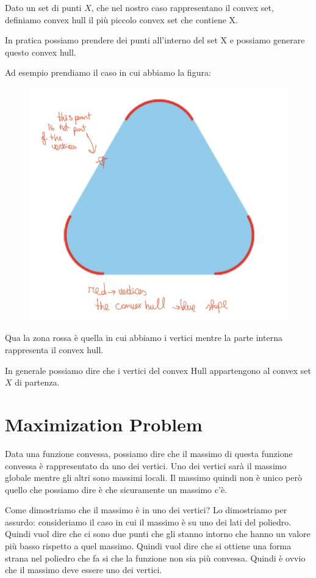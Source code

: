 \documentclass[14pt]{extreport}
\begin{document}
Dato un set di punti $X$, che nel nostro caso rappresentano il convex set, definiamo convex hull il più piccolo convex set che contiene X.

In pratica possiamo prendere dei punti all'interno del set X e possiamo generare questo convex hull.

Ad esempio prendiamo il caso in cui abbiamo la figura:

\begin{figure}[H]
\centering
\includegraphics[width=0.7\linewidth]{230.jpeg}
\end{figure}

Qua la zona rossa è quella in cui abbiamo i vertici mentre la parte interna rappresenta il convex hull.

In generale possiamo dire che i vertici del convex Hull appartengono al convex set $X$ di partenza.

\section{Maximization Problem}

Data una funzione convessa, possiamo dire che il massimo di questa funzione convessa è rappresentato da uno dei vertici. Uno dei vertici sarà il
massimo globale mentre gli altri sono massimi locali. Il massimo quindi non è unico però quello che possiamo dire è che sicuramente un massimo c'è.

Come dimostriamo che il massimo è in uno dei vertici? Lo dimostriamo per assurdo: consideriamo il caso in cui il massimo è su uno dei lati del
poliedro. Quindi vuol dire che ci sono due punti che gli stanno intorno che hanno un valore più basso rispetto a quel massimo. Quindi vuol dire che si
ottiene una forma strana nel poliedro che fa si che la funzione non sia più convessa. Quindi è ovvio che il massimo deve essere uno dei vertici.
\end{document}
